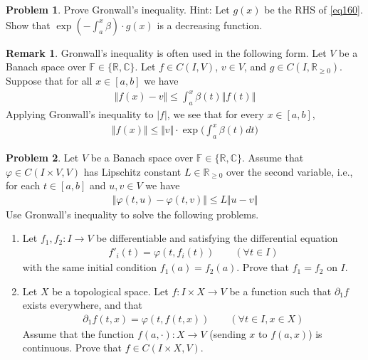 \documentclass[12pt,b5paper,notitlepage]{article}
\theoremstyle{definition}
\newtheorem{rem}[df]{Remark}
\newtheorem{prob}{\color{red}Problem}[section]
\theoremstyle{plain}
\newcommand{\Cbb}{\mathbb C}
\newcommand{\Rbb}{\mathbb R}
\newcommand{\Fbb}{\mathbb F}
\newcommand{\dps}{\displaystyle}
\numberwithin{equation}{section}
\begin{document}
\begin{prob}
Prove Gronwall's inequality. Hint: Let $g(x)$ be the RHS of \eqref{eq160}. Show that $\exp(-\int_a^x\beta)\cdot g(x)$ is a decreasing function.
\end{prob}

\begin{rem}
Gronwall's inequality is often used in the following form. Let $V$ be a Banach space over $\Fbb\in\{\Rbb,\Cbb\}$. Let $f\in C(I,V)$, $v\in V$, and $g\in C(I,\Rbb_{\geq0})$. Suppose that for all $x\in[a,b]$ we have
\begin{align}
\Vert f(x)-v\Vert\leq\int_a^x\beta(t)\Vert f(t)\Vert
\end{align}
Applying Gronwall's inequality to $|f|$, we see that for every $x\in[a,b]$,
\begin{align}
\Vert f(x)\Vert\leq \Vert v\Vert\cdot  \exp\Big(\int_a^x \beta(t)dt \Big)
\end{align}
\end{rem}





\begin{prob}
Let $V$ be a Banach space over $\Fbb\in\{\Rbb,\Cbb\}$. Assume that $\varphi\in C(I\times V,V)$ has Lipschitz constant $L\in\Rbb_{\geq0}$ over the second variable, i.e., for each $t\in[a,b]$ and $u,v\in V$ we have
\begin{align}
\Vert\varphi(t,u)-\varphi(t,v)\Vert\leq L\Vert u-v\Vert
\end{align}
Use Gronwall's inequality  to solve the following problems.
\begin{enumerate}
\item Let $f_1,f_2:I\rightarrow V$ be differentiable and satisfying the differential equation
\begin{align*}
\dps f'_i(t)=\varphi(t,f_i(t))\qquad (\forall t\in I)
\end{align*}
with the same initial condition $f_1(a)=f_2(a)$. Prove that $f_1=f_2$ on $I$.
\item Let $X$ be a topological space. Let $f:I\times X\rightarrow V$ be a function such that $\partial_1 f$ exists everywhere, and that
\begin{align*}
\partial_1 f(t,x)=\varphi(t,f(t,x))\qquad(\forall t\in I,x\in X)
\end{align*}
Assume that the function $f(a,\cdot):X\rightarrow V$ (sending $x$ to $f(a,x)$) is continuous. Prove that $f\in C(I\times X,V)$.
\end{enumerate} 
\end{prob}
\end{document}
